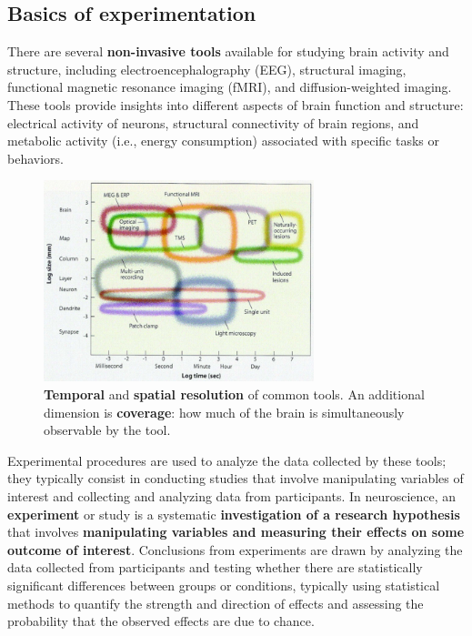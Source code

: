 \subsection{Basics of experimentation}
There are several \textbf{non-invasive tools} available for studying brain activity and structure, including electroencephalography (EEG), structural imaging, functional magnetic resonance imaging (fMRI), and diffusion-weighted imaging. These tools provide insights into different aspects of brain function and structure: electrical activity of neurons, structural connectivity of brain regions, and metabolic activity (i.e., energy consumption) associated with specific tasks or behaviors.

\begin{figure}[ht]
    \centering
  \captionsetup{width=.8\linewidth}
    \includegraphics[width=0.7\textwidth]{images/tools.png}
    \caption{\textbf{Temporal} and \textbf{spatial resolution} of common tools. An additional dimension is \textbf{coverage}: how much of the brain is simultaneously observable by the tool.}
\end{figure}
Experimental procedures are used to analyze the data collected by these tools; they typically consist in conducting studies that involve manipulating variables of interest and collecting and analyzing data from participants. In neuroscience, an \textbf{experiment} or study is a systematic \textbf{investigation of a research hypothesis} that involves \textbf{manipulating variables and measuring their effects on some outcome of interest}.
Conclusions from experiments are drawn by analyzing the data collected from participants and testing whether there are statistically significant differences between groups or conditions, typically using statistical methods to quantify the strength and direction of effects and assessing the probability that the observed effects are due to chance.\\

